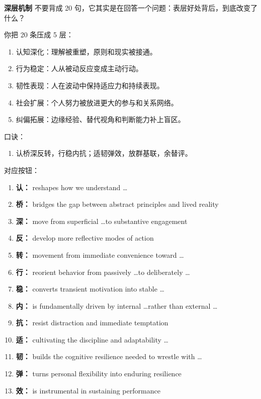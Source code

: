 ﻿\documentclass[lang=cn,11pt]{elegantbook}
\begin{document}
\begin{note}
\textbf{深层机制} 不要背成 20 句，它其实是在回答一个问题：表层好处背后，到底改变了什么？

你把 20 条压成 5 层：

\begin{enumerate}
  \item 认知深化：理解被重塑，原则和现实被接通。
  \item 行为稳定：人从被动反应变成主动行动。
  \item 韧性表现：人在波动中保持适应力和持续表现。
  \item 社会扩展：个人努力被放进更大的参与和关系网络。
  \item 纠偏拓展：边缘经验、替代视角和判断能力补上盲区。
\end{enumerate}

口诀：

\begin{enumerate}
  \item 认桥深反转，行稳内抗；适韧弹效，放群基联，余替评。
\end{enumerate}

对应按钮：

\begin{enumerate}
  \item \textbf{认：} reshapes how we understand \ldots
  \item \textbf{桥：} bridges the gap between abstract principles and lived reality
  \item \textbf{深：} move from superficial \ldots to substantive engagement
  \item \textbf{反：} develop more reflective modes of action
  \item \textbf{转：} movement from immediate convenience toward \ldots

  \item \textbf{行：} reorient behavior from passively \ldots to deliberately \ldots
  \item \textbf{稳：} converts transient motivation into stable \ldots
  \item \textbf{内：} is fundamentally driven by internal \ldots rather than external \ldots
  \item \textbf{抗：} resist distraction and immediate temptation

  \item \textbf{适：} cultivating the discipline and adaptability \ldots
  \item \textbf{韧：} builds the cognitive resilience needed to wrestle with \ldots
  \item \textbf{弹：} turns personal flexibility into enduring resilience
  \item \textbf{效：} is instrumental in sustaining performance


\end{enumerate}
\end{note}
\end{document}
